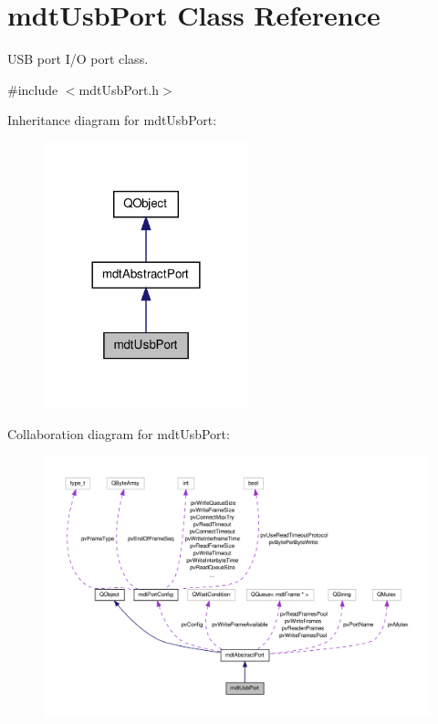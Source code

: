 \hypertarget{classmdt_usb_port}{\section{mdt\-Usb\-Port Class Reference}
\label{classmdt_usb_port}
}


U\-S\-B port I/\-O port class.  




{\ttfamily \#include $<$mdt\-Usb\-Port.\-h$>$}



Inheritance diagram for mdt\-Usb\-Port\-:
\nopagebreak
\begin{figure}[H]
\begin{center}
\leavevmode
\includegraphics[width=168pt]{classmdt_usb_port__inherit__graph}
\end{center}
\end{figure}


Collaboration diagram for mdt\-Usb\-Port\-:
\nopagebreak
\begin{figure}[H]
\begin{center}
\leavevmode
\includegraphics[width=350pt]{classmdt_usb_port__coll__graph}
\end{center}
\end{figure}
